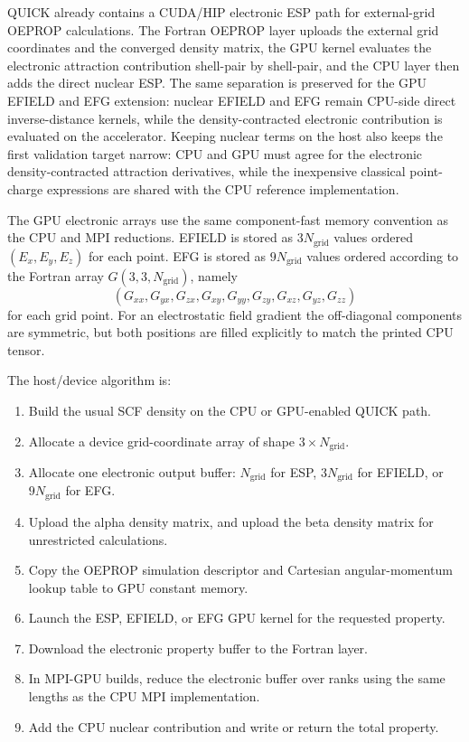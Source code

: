 \documentclass[journal=jcisd8,manuscript=suppinfo]{achemso}
\begin{document}
QUICK already contains a CUDA/HIP electronic ESP path for external-grid OEPROP calculations.  The Fortran OEPROP layer uploads the external grid coordinates and the converged density matrix, the GPU kernel evaluates the electronic attraction contribution shell-pair by shell-pair, and the CPU layer then adds the direct nuclear ESP.  The same separation is preserved for the GPU EFIELD and EFG extension: nuclear EFIELD and EFG remain CPU-side direct inverse-distance kernels, while the density-contracted electronic contribution is evaluated on the accelerator.  Keeping nuclear terms on the host also keeps the first validation target narrow: CPU and GPU must agree for the electronic density-contracted attraction derivatives, while the inexpensive classical point-charge expressions are shared with the CPU reference implementation.

The GPU electronic arrays use the same component-fast memory convention as the CPU and MPI reductions.  EFIELD is stored as \(3N_{\mathrm{grid}}\) values ordered \((E_x,E_y,E_z)\) for each point.  EFG is stored as \(9N_{\mathrm{grid}}\) values ordered according to the Fortran array \(G(3,3,N_{\mathrm{grid}})\), namely
\[
  (G_{xx},G_{yx},G_{zx},G_{xy},G_{yy},G_{zy},G_{xz},G_{yz},G_{zz})
\]
for each grid point.  For an electrostatic field gradient the off-diagonal components are symmetric, but both positions are filled explicitly to match the printed CPU tensor.

The host/device algorithm is:
\begin{enumerate}
  \item Build the usual SCF density on the CPU or GPU-enabled QUICK path.
  \item Allocate a device grid-coordinate array of shape \(3\times N_{\mathrm{grid}}\).
  \item Allocate one electronic output buffer: \(N_{\mathrm{grid}}\) for ESP, \(3N_{\mathrm{grid}}\) for EFIELD, or \(9N_{\mathrm{grid}}\) for EFG.
  \item Upload the alpha density matrix, and upload the beta density matrix for unrestricted calculations.
  \item Copy the OEPROP simulation descriptor and Cartesian angular-momentum lookup table to GPU constant memory.
  \item Launch the ESP, EFIELD, or EFG GPU kernel for the requested property.
  \item Download the electronic property buffer to the Fortran layer.
  \item In MPI-GPU builds, reduce the electronic buffer over ranks using the same lengths as the CPU MPI implementation.
  \item Add the CPU nuclear contribution and write or return the total property.
\end{enumerate}
\end{document}
